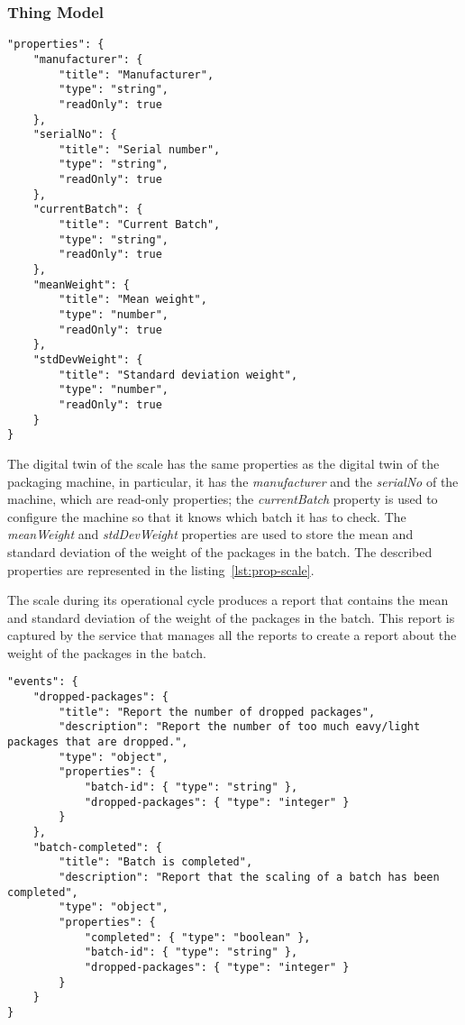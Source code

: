 \subsubsection{Thing Model}

\begin{lstlisting}[caption={Properties of the scale Thing Model.},label={lst:prop-scale}]
"properties": {
	"manufacturer": {
		"title": "Manufacturer",
		"type": "string",
		"readOnly": true
	},
	"serialNo": {
		"title": "Serial number",
		"type": "string",
		"readOnly": true
	},
	"currentBatch": {
		"title": "Current Batch",
		"type": "string",
		"readOnly": true
	},
	"meanWeight": {
		"title": "Mean weight",
		"type": "number",
		"readOnly": true
	},
	"stdDevWeight": {
		"title": "Standard deviation weight",
		"type": "number",
		"readOnly": true
	}
}
\end{lstlisting}

The digital twin of the scale has the same properties as the digital twin of the packaging machine, in particular, it has the \textit{manufacturer} and the \textit{serialNo} of the machine, which are read-only properties; the \textit{currentBatch} property is used to configure the machine so that it knows which batch it has to check. The \textit{meanWeight} and \textit{stdDevWeight} properties are used to store the mean and standard deviation of the weight of the packages in the batch. The described properties are represented in the listing~\ref{lst:prop-scale}.

The scale during its operational cycle produces a report that contains the mean and standard deviation of the weight of the packages in the batch. This report is captured by the service that manages all the reports to create a report about the weight of the packages in the batch.

\begin{lstlisting}[caption={Events of the scale Thing Model.},label={lst:event-scale}]
"events": {
	"dropped-packages": {
		"title": "Report the number of dropped packages",
		"description": "Report the number of too much eavy/light packages that are dropped.",
		"type": "object",
		"properties": {
			"batch-id": { "type": "string" },
			"dropped-packages": { "type": "integer" }
		}
	},
	"batch-completed": {
		"title": "Batch is completed",
		"description": "Report that the scaling of a batch has been completed",
		"type": "object",
		"properties": {
			"completed": { "type": "boolean" },
			"batch-id": { "type": "string" },
			"dropped-packages": { "type": "integer" }
		}
	}
}
\end{lstlisting}

